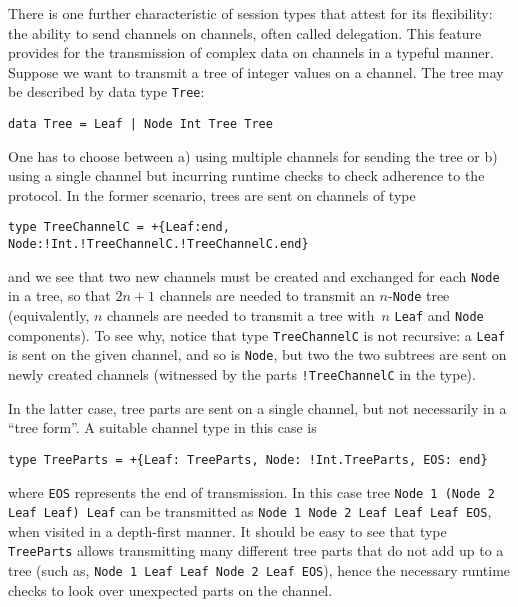 There is one further characteristic of session types that attest for
its flexibility: the ability to send channels on channels, often
called delegation. This feature provides for the transmission of
complex data on channels in a typeful manner. Suppose we want to
transmit a tree of integer values on a channel. The tree may be
described by data type \lstinline|Tree|:
%
\begin{lstlisting}
data Tree = Leaf | Node Int Tree Tree
\end{lstlisting}

One has to choose between a) using multiple channels for
sending the tree or b) using a single channel but incurring runtime
checks to check adherence to the protocol. In the former scenario,
trees are sent on channels of type
%
\begin{lstlisting}[morekeywords=end]
type TreeChannelC = +{Leaf:end, Node:!Int.!TreeChannelC.!TreeChannelC.end}
\end{lstlisting}
%
and we see that two new channels must be created and exchanged for
each \lstinline|Node| in a tree, so that $2n+1$ channels are needed to
transmit an $n$-\lstinline|Node| tree (equivalently, $n$ channels are
needed to transmit a tree with~$n$ \lstinline|Leaf| and
\lstinline|Node| components).
%
To see why, notice that type \lstinline|TreeChannelC| is not
recursive: a \lstinline|Leaf| is sent on the given channel, and so is
\lstinline|Node|, but two the two subtrees are sent on newly created
channels (witnessed by the parts \lstinline|!TreeChannelC| in the type).

In the latter case, tree parts are sent on a single channel, but not
necessarily in a ``tree form''. A suitable channel type in this case
is
%
\begin{lstlisting}[morekeywords=end]
type TreeParts = +{Leaf: TreeParts, Node: !Int.TreeParts, EOS: end}
\end{lstlisting}
%
where \lstinline|EOS| represents the end of transmission. In this case
tree \lstinline|Node 1 (Node 2 Leaf Leaf) Leaf| can be transmitted as
\lstinline|Node 1 Node 2 Leaf Leaf Leaf EOS|, when visited in a
depth-first manner. It should be easy to see that type
\lstinline|TreeParts| allows transmitting many different tree parts
that do not add up to a tree (such as,
%
\lstinline|Node 1 Leaf Leaf Node 2 Leaf EOS|), hence the necessary
runtime checks to look over unexpected parts on the channel.

